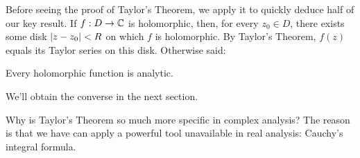 \goodbreak

Before seeing the proof of Taylor's Theorem, we apply it to quickly deduce half of our key result.\smallbreak
If $f:D\to\mathbb{C}$ is holomorphic, then, for every $z_0\in D$, there exists some disk $\left| z-z_0\right|<R$ on which $f$ is holomorphic. By Taylor's Theorem, $f(z)$ equals its Taylor series on this disk. Otherwise said:

\begin{cor}{}{}
	Every holomorphic function is analytic.
\end{cor}

We'll obtain the converse in the next section.\bigbreak

Why is Taylor's Theorem so much more specific in complex analysis? The reason is that we have can apply a powerful tool unavailable in real analysis: Cauchy's integral formula.

